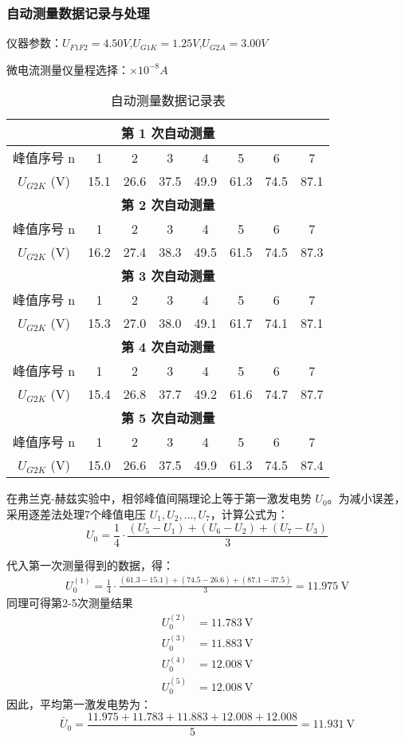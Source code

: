 \documentclass[]{../template/Report}%
\begin{document}
\begin{fullreportonly}
\subsubsection{自动测量数据记录与处理}
仪器参数：$U_{F1F2}=4.50V$,$U_{G1K}=1.25V$,$U_{G2A}=3.00V$
\par
微电流测量仪量程选择：$\times 10^{-8}A$
\begin{table}[H]
\centering
\caption{自动测量数据记录表} %
\label{tab:measurements}
\begin{tabular}{|c|c|c|c|c|c|c|c|}
\hline
\multicolumn{8}{|c|}{\textbf{第 1 次自动测量}} \\
\hline
峰值序号 n & 1 & 2 & 3 & 4 & 5 & 6 & 7 \\
\hline
$U_{G2K}$ (V) & 15.1&26.6 &37.5 &49.9 &61.3 &74.5 &87.1 \\
\hline
\multicolumn{8}{|c|}{\textbf{第 2 次自动测量}} \\
\hline
峰值序号 n & 1 & 2 & 3 & 4 & 5 & 6 & 7 \\
\hline
$U_{G2K}$ (V) &16.2 &27.4 &38.3 &49.5 &61.5 &74.5 &87.3 \\
\hline
\multicolumn{8}{|c|}{\textbf{第 3 次自动测量}} \\
\hline
峰值序号 n & 1 & 2 & 3 & 4 & 5 & 6 & 7 \\
\hline
$U_{G2K}$ (V) &15.3 &27.0 &38.0 &49.1 &61.7 &74.1 &87.1 \\
\hline
\multicolumn{8}{|c|}{\textbf{第 4 次自动测量}} \\
\hline
峰值序号 n & 1 & 2 & 3 & 4 & 5 & 6 & 7 \\
\hline
$U_{G2K}$ (V) &15.4 &26.8 &37.7 &49.2 &61.6 &74.7 &87.7 \\
\hline
\multicolumn{8}{|c|}{\textbf{第 5 次自动测量}} \\
\hline
峰值序号 n & 1 & 2 & 3 & 4 & 5 & 6 & 7 \\
\hline
$U_{G2K}$ (V) &15.0 &26.6 &37.5 &49.9 &61.3 &74.5 &87.4 \\
\hline
\end{tabular}
\end{table}

在弗兰克-赫兹实验中，相邻峰值间隔理论上等于第一激发电势 $U_0$。为减小误差，采用逐差法处理7个峰值电压 $U_1, U_2, \dots, U_7$，计算公式为：
\[
U_0 = \frac{1}{4} \cdot \frac{(U_5 - U_1) + (U_6 - U_2) + (U_7 - U_3)}{3}
\]

代入第一次测量得到的数据，得：
\begin{align*}
U_0^{(1)} = \frac{1}{4} \cdot \frac{(61.3 - 15.1) + (74.5 - 26.6) + (87.1 - 37.5)}{3} = \SI{11.975}{\volt}
\end{align*}
同理可得第2-5次测量结果
\begin{align*}
U_0^{(2)} &= \SI{11.783}{\volt} \\
U_0^{(3)} &= \SI{11.883}{\volt} \\
U_0^{(4)} &= \SI{12.008}{\volt} \\
U_0^{(5)} &= \SI{12.008}{\volt}
\end{align*}
因此，平均第一激发电势为：
\[
\bar{U}_0 = \frac{11.975 + 11.783 + 11.883 + 12.008 + 12.008}{5} = \SI{11.931}{\volt}
\]


\end{fullreportonly}
\end{document}
